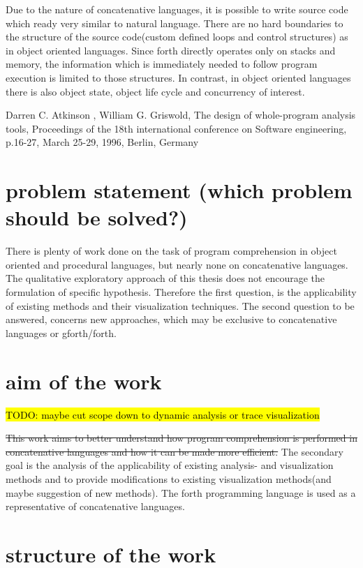 Due to the nature of concatenative languages, it is possible to write source code which ready very similar to natural language. There are no hard boundaries to the structure of the source code(custom defined loops and control structures) as in object oriented languages. Since forth directly operates only on stacks and memory, the information which is immediately needed to follow program execution is limited to those structures. In contrast, in object oriented languages there is also object state, object life cycle and concurrency of interest.

Darren C. Atkinson , William G. Griswold, The design of whole-program analysis tools, Proceedings of the 18th international conference on Software engineering, p.16-27, March 25-29, 1996, Berlin, Germany

\section{problem statement (which problem should be solved?)}

There is plenty of work done on the task of program comprehension in object oriented and procedural languages\cite{Cornelissen:2009:SSP:1638616.1639301}, but nearly none on concatenative languages. The qualitative exploratory approach of this thesis does not encourage the formulation of specific hypothesis. Therefore the first question, is the applicability of existing methods and their visualization techniques. The second question to be answered, concerns new approaches, which may be exclusive to concatenative languages or gforth/forth.

\section{aim of the work}

\hl{TODO: maybe cut scope down to dynamic analysis or trace visualization}

\sout{This work aims to better understand how program comprehension is performed in concatenative languages and how it can be made more efficient.} The secondary goal is the analysis of the applicability of existing analysis- and visualization methods and to provide modifications to existing visualization methods(and maybe suggestion of new methods). The forth programming language is used as a representative of concatenative languages.

\section{structure of the work}

